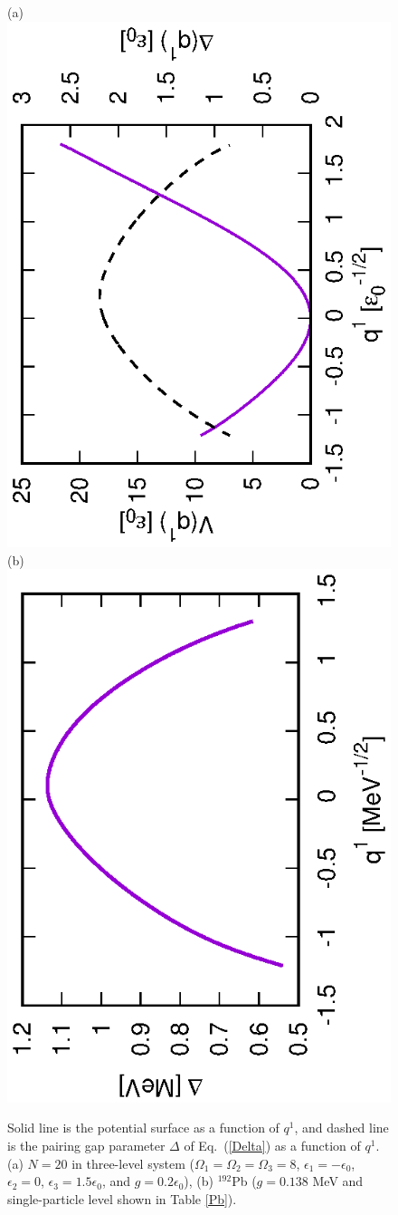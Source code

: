 \documentclass[11pt]{book} %
\begin{document}

\begin{figure}[tb]
 \begin{center}
(a) \includegraphics[height=0.44\textwidth,angle=-90]{images/N20gap.eps}
(b) \includegraphics[height=0.44\textwidth,angle=-90]{images/192Pbgap.eps}
 \end{center}
 \caption{Solid line is the potential surface as a function of $q^1$, and
 dashed line is the pairing gap parameter $\Delta$
 of Eq.~(\ref{Delta}) as a function of $q^1$.
 (a) $N=20$ in three-level system ($\Omega_1=\Omega_2=\Omega_3=8$,
$\epsilon_1=-\epsilon_0$, $\epsilon_2=0$, $\epsilon_3=1.5\epsilon_0$,
and $g=0.2\epsilon_0$), (b) ${}^{192}$Pb ($g=0.138$ MeV and single-particle level shown in Table \ref{Pb}).
}
 \label{q_Delta}
\end{figure}
\end{document}
